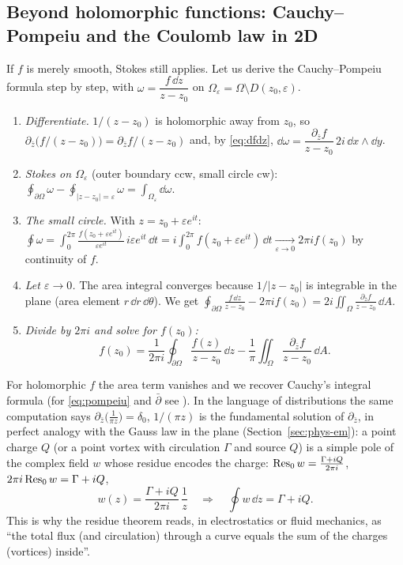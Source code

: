 \subsection{Beyond holomorphic functions: Cauchy--Pompeiu and the Coulomb law in 2D}\label{sec:pompeiu}

If $f$ is merely smooth, Stokes still applies. Let us derive the Cauchy--Pompeiu formula step by step, with $\omega=\dfrac{f\,\dd z}{z-z_0}$ on $\Omega_\varepsilon=\Omega\setminus D(z_0,\varepsilon)$.
\begin{enumerate}
\item \emph{Differentiate.} $1/(z-z_0)$ is holomorphic away from $z_0$, so $\partial_{\bar z}\bigl(f/(z-z_0)\bigr)=\partial_{\bar z}f/(z-z_0)$ and, by \eqref{eq:dfdz}, $\dd\omega=\dfrac{\partial_{\bar z}f}{z-z_0}\,2i\,\dd x\wedge\dd y$.
\item \emph{Stokes on $\Omega_\varepsilon$} (outer boundary ccw, small circle cw): $\displaystyle\oint_{\partial\Omega}\omega-\oint_{|z-z_0|=\varepsilon}\omega=\int_{\Omega_\varepsilon}\dd\omega$.
\item \emph{The small circle.} With $z=z_0+\varepsilon e^{it}$: $\displaystyle\oint\omega=\int_0^{2\pi}\frac{f(z_0+\varepsilon e^{it})}{\varepsilon e^{it}}\,i\varepsilon e^{it}\,\dd t=i\int_0^{2\pi}f(z_0+\varepsilon e^{it})\,\dd t\xrightarrow[\varepsilon\to0]{}2\pi if(z_0)$ by continuity of $f$.
\item \emph{Let $\varepsilon\to0$.} The area integral converges because $1/|z-z_0|$ is integrable in the plane (area element $r\,\dd r\,\dd\theta$). We get $\displaystyle\oint_{\partial\Omega}\frac{f\,\dd z}{z-z_0}-2\pi if(z_0)=2i\iint_\Omega\frac{\partial_{\bar z}f}{z-z_0}\,\dd A$.
\item \emph{Divide by $2\pi i$ and solve for $f(z_0)$:}
\begin{equation}\label{eq:pompeiu}
f(z_0)=\frac1{2\pi i}\oint_{\partial\Omega}\frac{f(z)}{z-z_0}\,\dd z-\frac1\pi\iint_\Omega\frac{\partial_{\bar z}f}{z-z_0}\,\dd A .
\end{equation}
\end{enumerate}
For holomorphic $f$ the area term vanishes and we recover Cauchy's integral formula (for \eqref{eq:pompeiu} and $\bar\partial$ see \cite{Hormander}). In the language of distributions the same computation says $\partial_{\bar z}\bigl(\frac1{\pi z}\bigr)=\delta_0$, \ie $1/(\pi z)$ is the fundamental solution of $\partial_{\bar z}$, in perfect analogy with the Gauss law in the plane (Section~\ref{sec:phys-em}): a point charge $Q$ (or a point vortex with circulation $\Gamma$ and source $Q$) is a simple pole of the complex field $w$ whose residue encodes the charge: $\operatorname{Res}_0w=\frac{\Gamma+iQ}{2\pi i}$, \ie $2\pi i\operatorname{Res}_0w=\Gamma+iQ$,
\[
w(z)=\frac{\Gamma+iQ}{2\pi i}\,\frac1z\quad\Longrightarrow\quad\oint w\,\dd z=\Gamma+iQ .
\]
This is why the residue theorem reads, in electrostatics or fluid mechanics, as ``the total flux (and circulation) through a curve equals the sum of the charges (vortices) inside''.
